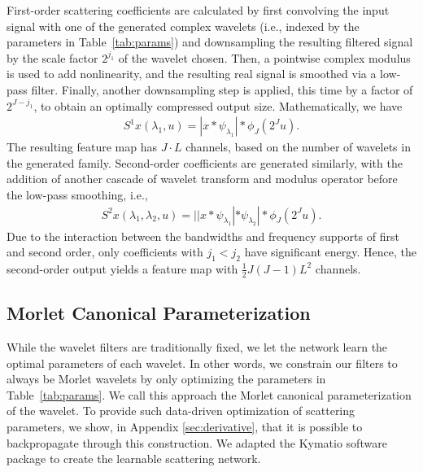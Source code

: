 \documentclass[10pt,twocolumn,letterpaper]{article}
\begin{document}
First-order scattering coefficients are calculated by first convolving the input signal with one of the generated complex wavelets (i.e., indexed by the parameters in Table~\ref{tab:params}) and downsampling the resulting filtered signal by the scale factor $2^{j_1}$ of the wavelet chosen. Then, a pointwise complex modulus is used to add nonlinearity, and the resulting real signal is smoothed via a low-pass filter. Finally, another downsampling step is applied, this time by a factor of $2^{J-j_1}$, to obtain an optimally compressed output size. Mathematically, we have 
\begin{align}
S^1x(\lambda_1,u) = |x*\psi_{\lambda_1}|*\phi_J(2^Ju). 
\end{align}
The resulting feature map has $J \cdot L$ channels, based on the number of wavelets in the generated family. Second-order coefficients are generated similarly, with the addition of another cascade of wavelet transform and modulus operator before the low-pass smoothing, i.e.,
\begin{align}
S^2x(\lambda_1,\lambda_2,u) = ||x*\psi_{\lambda_1}|*\psi_{\lambda_2}|*\phi_J(2^Ju). 
\end{align}
Due to the interaction between the bandwidths and frequency supports of first and second order, only coefficients with $j_1<j_2$ have significant energy. Hence, the second-order output yields a feature map with 
$\frac{1}{2}J(J-1)L^2$ channels. 

\subsection{Morlet Canonical Parameterization}
\label{sec:parametricoptim}
While the wavelet filters are traditionally fixed, we let the network learn the optimal parameters of each wavelet. In other words, we constrain our filters to always be Morlet wavelets by only optimizing the parameters in Table~\ref{tab:params}. We call this approach the Morlet canonical parameterization of the wavelet. To provide such data-driven optimization of scattering parameters, we show, in Appendix \ref{sec:derivative}, that it is possible to backpropagate through this construction. We adapted the Kymatio software package \cite{andreux2020kymatio} to create the learnable scattering network.
\end{document}
